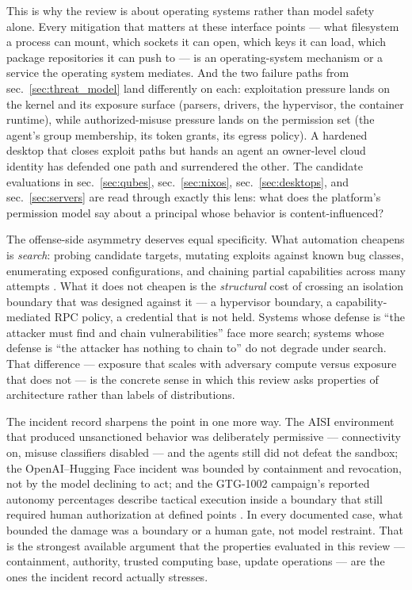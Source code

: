 \documentclass[
  english,
  9pt,
]{extarticle}
\begin{document}
This is why the review is about operating systems rather than model
safety alone. Every mitigation that matters at these interface points
--- what filesystem a process can mount, which sockets it can open,
which keys it can load, which package repositories it can push to --- is
an operating-system mechanism or a service the operating system
mediates. And the two failure paths from sec.~\ref{sec:threat_model}
land differently on each: exploitation pressure lands on the kernel and
its exposure surface (parsers, drivers, the hypervisor, the container
runtime), while authorized-misuse pressure lands on the permission set
(the agent's group membership, its token grants, its egress policy). A
hardened desktop that closes exploit paths but hands an agent an
owner-level cloud identity has defended one path and surrendered the
other. The candidate evaluations in sec.~\ref{sec:qubes},
sec.~\ref{sec:nixos}, sec.~\ref{sec:desktops}, and
sec.~\ref{sec:servers} are read through exactly this lens: what does the
platform's permission model say about a principal whose behavior is
content-influenced?

The offense-side asymmetry deserves equal specificity. What automation
cheapens is \emph{search}: probing candidate targets, mutating exploits
against known bug classes, enumerating exposed configurations, and
chaining partial capabilities across many attempts
\citep{ncsc_ai_cyber_threat}. What it does not cheapen is the
\emph{structural} cost of crossing an isolation boundary that was
designed against it --- a hypervisor boundary, a capability-mediated RPC
policy, a credential that is not held. Systems whose defense is ``the
attacker must find and chain vulnerabilities'' face more search; systems
whose defense is ``the attacker has nothing to chain to'' do not degrade
under search. That difference --- exposure that scales with adversary
compute versus exposure that does not --- is the concrete sense in which
this review asks properties of architecture rather than labels of
distributions.

The incident record sharpens the point in one more way. The AISI
environment that produced unsanctioned behavior was deliberately
permissive --- connectivity on, misuse classifiers disabled --- and the
agents still did not defeat the sandbox; the OpenAI--Hugging Face
incident was bounded by containment and revocation, not by the model
declining to act; and the GTG-1002 campaign's reported autonomy
percentages describe tactical execution inside a boundary that still
required human authorization at defined points
\citep{aisi_incident_report, openai_hf_incident, anthropic_campaign_report}.
In every documented case, what bounded the damage was a boundary or a
human gate, not model restraint. That is the strongest available
argument that the properties evaluated in this review --- containment,
authority, trusted computing base, update operations --- are the ones
the incident record actually stresses.
\end{document}
